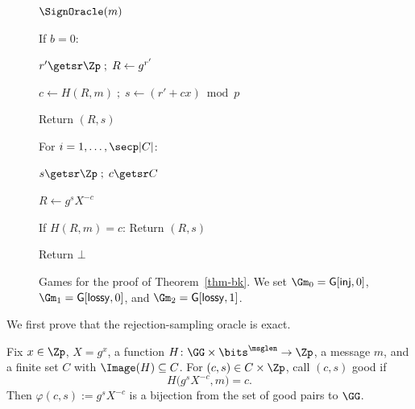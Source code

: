 \begin{figure}[t]
{
\begin{oracle}{$\SignOracle(m)$}
\item If $b=0$:
\item \quad $r'\getsr\Zp\;;\;R\gets g^{r'}$
\item \quad $c\gets H(R,m)\;;\;s\gets(r'+cx)\bmod p$
\item \quad Return $(R,s)$
\item For $i=1,\ldots,\secp|C|$:
\item \quad $s\getsr\Zp\;;\;c\getsr C$
\item \quad $R\gets g^sX^{-c}$
\item \quad If $H(R,m)=c$: Return $(R,s)$
\item Return $\bot$
\end{oracle}
}
\vspace{-12pt}
\caption{Games for the proof of Theorem~\ref{thm-bk}. We set $\Gm_0=\mathsf{G}[\mathsf{inj},0]$, $\Gm_1=\mathsf{G}[\mathsf{lossy},0]$, and $\Gm_2=\mathsf{G}[\mathsf{lossy},1]$.}\label{fig-bk-games}
\vspace{-3pt}\hrulefill
\vspace{-1ex}
\end{figure}

We first prove that the rejection-sampling oracle is exact.

\begin{lemma} \label{lem-sim}
Fix $x\in\Zp$, $X=g^x$, a function $H \colon \GG \times \bits^{\msglen} \to \Zp$, a message $m$, and a finite set $C$ with $\Image(H) \subseteq C$. For $(c,s)\in C\times\Zp$, call $(c,s)$ good if
$$
H\bigl(g^sX^{-c},m\bigr)=c.
$$
Then $\varphi(c,s):=g^sX^{-c}$ is a bijection from the set of good pairs to $\GG$.
\end{lemma}

